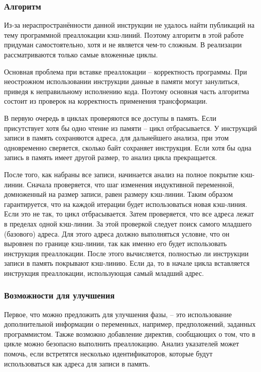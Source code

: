 \documentclass[12pt,a4paper,oneside]{article}
\begin{document}
\subsubsection{Алгоритм}

\indent

Из-за нераспространённости данной инструкции не удалось найти публикаций на тему программной преаллокации кэш-линий. Поэтому алгоритм в этой работе придуман самостоятельно, хотя и не является чем-то сложным. В реализации рассматриваются только самые вложенные циклы.

Основная проблема при вставке преаллокации -- корректность программы. При неострожном использовании инструкции данные в памяти могут занулиться, приведя к неправильному исполнению кода. Поэтому основная часть алгоритма состоит из проверок на корректность применения трансформации.



В первую очередь в циклах проверяются все доступы в память. Если присутствует хотя бы одно чтение из памяти -- цикл отбрасывается. У инструкций записи в память сохраняются адреса, для дальнейшего анализа, при этом одновременно сверяется, сколько байт сохраняет инструкция. Если хотя бы одна запись в память имеет другой размер, то анализ цикла прекращается.

После того, как набраны все записи, начинается анализ на полное покрытие кэш-линии. Сначала проверяется, что шаг изменения индуктивной переменной, домноженный на размер записи, равен размеру кэш-линии. Таким образом гарантируется, что на каждой итерации будет использоваться новая кэш-линия. Если это не так, то цикл отбрасывается. Затем проверяется, что все адреса лежат в пределах одной кэш-линии. За этой проверкой следует поиск самого младшего (базового) адреса. Для этого адреса должно выполняться условие, что он выровнен по границе кэш-линии, так как именно его будет использовать инструкция преаллокации. После этого вычисляется, полностью ли инструкции записи в память покрывают кэш-линию. Если да, то в начале цикла вставляется инструкция преаллокации, использующая самый младший адрес.

\subsubsection{Возможности для улучшения}

\indent

Первое, что можно предложить для улучшения фазы, -- это использование дополнительной информации о переменных, например, предположений, заданных программистом. Также возможно добавление директив, сообщающих о том, что в цикле можно безопасно выполнить преаллокацию. Анализ указателей может помочь, если встретятся несколько идентификаторов, которые будут использоваться как адреса для записи в память.
\end{document}
